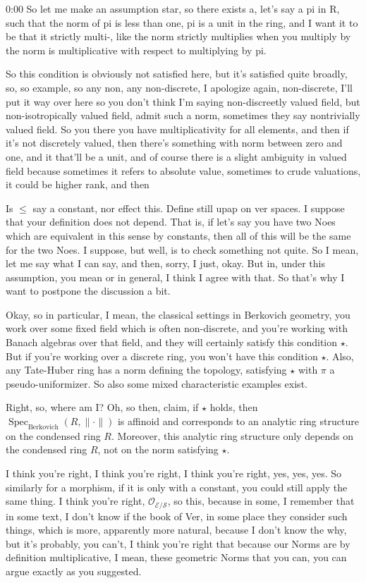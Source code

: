 \begin{unfinished}{0:00}
So let me make an assumption star, so there exists a, let's say a pi in R, such that the norm of pi is less than one, pi is a unit in the ring, and I want it to be that it strictly multi-, like the norm strictly multiplies when you multiply by the norm is multiplicative with respect to multiplying by pi.

So this condition is obviously not satisfied here, but it's satisfied quite broadly, so, so example, so any non, any non-discrete, I apologize again, non-discrete, I'll put it way over here so you don't think I'm saying non-discreetly valued field, but non-isotropically valued field, admit such a norm, sometimes they say nontrivially valued field. So you there you have multiplicativity for all elements, and then if it's not discretely valued, then there's something with norm between zero and one, and it that'll be a unit, and of course there is a slight ambiguity in valued field because sometimes it refers to absolute value, sometimes to crude valuations, it could be higher rank, and then

Is $\leq$ say a constant, nor effect this. Define still upap on ver spaces. I suppose that your definition does not depend. That is, if let's say you have two Noes which are equivalent in this sense by constants, then all of this will be the same for the two Noes. I suppose, but well, is to check something not quite. So I mean, let me say what I can say, and then, sorry, I just, okay. But in, under this assumption, you mean or in general, I think I agree with that. So that's why I want to postpone the discussion a bit. 

Okay, so in particular, I mean, the classical settings in Berkovich geometry, you work over some fixed field which is often non-discrete, and you're working with Banach algebras over that field, and they will certainly satisfy this condition $\star$. But if you're working over a discrete ring, you won't have this condition $\star$. 
Also, any Tate-Huber ring has a norm defining the topology, satisfying $\star$ with $\pi$ a pseudo-uniformizer. 
So also some mixed characteristic examples exist.

Right, so, where am I? Oh, so then, claim, if $\star$ holds, then $\operatorname{Spec}_{\mathrm{Berkovich}} (R, \|\cdot\|)$ is affinoid and corresponds to an analytic ring structure on the condensed ring $R$. Moreover, this analytic ring structure only depends on the condensed ring $R$, not on the norm satisfying $\star$.

I think you're right, I think you're right, I think you're right, yes, yes, yes. So similarly for a morphism, if it is only with a constant, you could still apply the same thing. I think you're right, $\mathcal{O}_{\mathcal{E}/\mathcal{S}}$, so this, because in some, I remember that in some text, I don't know if the book of Ver, in some place they consider such things, which is more, apparently more natural, because I don't know the why, but it's probably, you can't, I think you're right that because our Norms are by definition multiplicative, I mean, these geometric Norms that you can, you can argue exactly as you suggested.


\end{unfinished}
